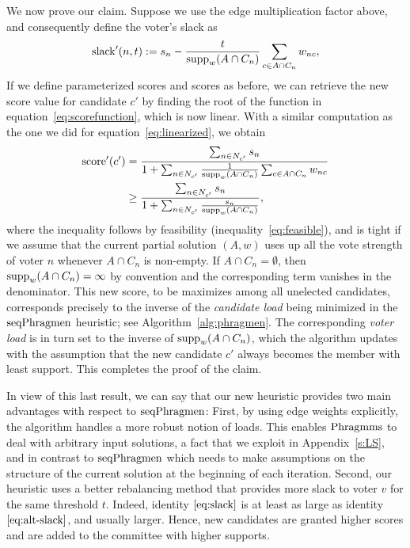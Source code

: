 We now prove our claim. Suppose we use the edge multiplication factor above, and consequently define the voter's slack as
\begin{align}\label{eq:alt-slack}
\operatorname{slack}'(n,t):=s_n - \frac{t}{\operatorname{supp}_w(A\cap C_n)}\sum_{c\in A\cap C_n} w_{nc},
\end{align}
%
If we define parameterized scores and scores as before, we can retrieve the new score value for candidate $c'$ by finding the root of the function in equation~\eqref{eq:scorefunction}, which is now linear. 
With a similar computation as the one we did for equation~\eqref{eq:linearized}, we obtain
\begin{align*}
\operatorname{score}'(c') 
&=\frac{\sum_{n\in N_{c'}} s_n}{1+\sum_{n\in N_{c'}} \frac{1}{\operatorname{supp}_w(A\cap C_n)} \sum_{c\in A\cap C_n} w_{nc} } \\
&\geq  \frac{\sum_{n\in N_{c'}} s_n}{1+\sum_{n\in N_{c'}} \frac{s_n}{\operatorname{supp}_w(A\cap C_n)}}, 
\end{align*}
%
where the inequality follows by feasibility (inequality~\ref{eq:feasible}), and is tight if we assume that the current partial solution $(A,w)$ uses up all the vote strength of voter $n$ whenever $A\cap C_n$ is non-empty. If $A\cap C_n=\emptyset$, then $\operatorname{supp}_w(A\cap C_n)=\infty$ by convention and the corresponding term vanishes in the denominator. 
%
This new score, to be maximizes among all unelected candidates, corresponds precisely to the inverse of the \emph{candidate load} being minimized in the $\operatorname{seqPhragmen}$ heuristic; see Algorithm~\ref{alg:phragmen}. The corresponding \emph{voter load} is in turn set to the inverse of $\operatorname{supp}_w(A\cap C_n)$, which the algorithm updates with the assumption that the new candidate $c'$ always becomes the member with least support. This completes the proof of the claim.

In view of this last result, we can say that our new heuristic provides two main advantages with respect to $\operatorname{seqPhragmen}$: 
First, by using edge weights explicitly, the algorithm handles a more robust notion of loads. 
This enables $\operatorname{Phragmms}$ to deal with arbitrary input solutions, a fact that we exploit in Appendix~\ref{s:LS}, and in contrast to $\operatorname{seqPhragmen}$ which needs to make assumptions on the structure of the current solution at the beginning of each iteration.  
Second, our heuristic uses a better rebalancing method that provides more slack to voter $v$ for the same threshold $t$. Indeed, identity $\eqref{eq:slack}$ is at least as large as identity $\ref{eq:alt-slack}$, and usually larger. Hence, new candidates are granted higher scores and are added to the committee with higher supports.


